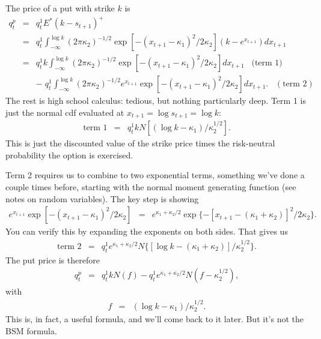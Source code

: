\documentclass[11pt]{article}
\begin{document}
The price of a put with strike $k$ is
\begin{eqnarray*}
    q^p_t &=&  q^1_t E^* (k - s_{t+1})^+  \\
            &=& q^1_t \int_{-\infty}^{\log k} (2 \pi \kappa_2)^{-1/2}
                    \exp[ - (x_{t+1} - \kappa_1)^2/2\kappa_2]
                    \left( k - e^{x_{t+1}} \right) d x_{t+1} \\
            &=& q^1_t k \int_{-\infty}^{\log k} (2 \pi \kappa_2)^{-1/2}
                    \exp[ - (x_{t+1} - \kappa_1)^2/2\kappa_2] d x_{t+1}
                    \;\;\; \mbox{(term 1)}\\
            &&    - \; q^1_t \int_{-\infty}^{\log k} (2 \pi \kappa_2)^{-1/2}
                    e^{x_{t+1}} \exp[ - (x_{t+1} - \kappa_1)^2/2\kappa_2] d x_{t+1} .
                     \;\;\; (\mbox{term 2})
\end{eqnarray*}
The rest is high school calculus:  tedious, but nothing particularly deep.
Term 1 is just the normal cdf evaluated at $x_{t+1} = \log s_{t+1} = \log k$:
\begin{eqnarray*}
    \mbox{term 1} &=&  q^1_t k N [ (\log k - \kappa_1)/\kappa_2^{1/2}] .
\end{eqnarray*}
This is just the discounted value of the strike price times
the risk-neutral probability the option is exercised.

Term 2 requires us to combine to two exponential terms, something
we've done a couple times before, starting with the normal
moment generating function (see notes on random variables).
The key step is showing
\begin{eqnarray*}
    e^{x_{t+1}} \exp[ - (x_{t+1} - \kappa_1)^2/2\kappa_2] &=&
        e^{\kappa_1 + \kappa_2/2} \exp\{ - [x_{t+1} - (\kappa_1+\kappa_2)]^2/2\kappa_2 \} .
\end{eqnarray*}
You can verify this by expanding the exponents on both sides.
That gives us
\begin{eqnarray*}
    \mbox{term 2} &=& q^1_t e^{\kappa_1 + \kappa_2/2}
            N \{ [\log k - (\kappa_1 + \kappa_2)]/\kappa_2^{1/2} \} .
\end{eqnarray*}
The put price is therefore
\begin{eqnarray}
    q^p_t &=& q^1_t k N (f) - q^1_t e^{\kappa_1 + \kappa_2/2}
            N ( f - \kappa_2^{1/2} ),
    \label{eq:bsm-put-kappas}
\end{eqnarray}
with
\begin{eqnarray*}
    f &=&  (\log k - \kappa_1)/\kappa_2^{1/2} .
\end{eqnarray*}
This is, in fact, a useful formula, and we'll come back to it later.
But it's not the BSM formula.
\end{document}
